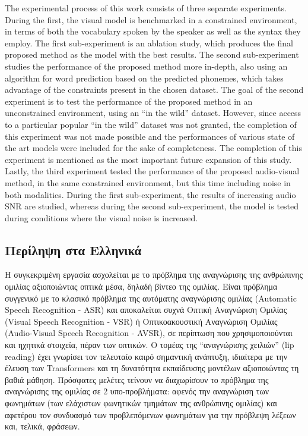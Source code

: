 The experimental process of this work consists of three separate experiments. During the first, the visual model is benchmarked in a constrained environment, in terms of both the vocabulary spoken by the speaker as well as the syntax they employ. The first sub-experiment is an ablation study, which produces the final proposed method as the model with the best results. The second sub-experiment studies the performance of the proposed method more in-depth, also using an algorithm for word prediction based on the predicted phonemes, which takes advantage of the constraints present in the chosen dataset. The goal of the second experiment is to test the performance of the proposed method in an unconstrained environment, using an ``in the wild'' dataset. However, since access to a particular popular ``in the wild'' dataset was not granted, the completion of this experiment was not made possible and the performances of various state of the art models were included for the sake of completeness. The completion of this experiment is mentioned as the most important future expansion of this study. Lastly, the third experiment tested the performance of the proposed audio-visual method, in the same constrained environment, but this time including noise in both modalities. During the first sub-experiment, the results of increasing audio SNR are studied, whereas during the second sub-experiment, the model is tested during conditions where the visual noise is increased.

\newpage
\subsection{Περίληψη στα Ελληνικά}

Η συγκεκριμένη εργασία ασχολείται με το πρόβλημα της αναγνώρισης της ανθρώπινης ομιλίας αξιοποιώντας οπτικά μέσα, δηλαδή βίντεο της ομιλίας. Είναι πρόβλημα συγγενικό με το κλασικό πρόβλημα της αυτόματης αναγνώρισης ομιλίας (Automatic Speech Recognition - ASR) και αποκαλείται συχνά Οπτική Αναγνώριση Ομιλίας (Visual Speech Recognition - VSR) ή Οπτικοακουστική Αναγνώριση Ομιλίας (Audio-Visual Speech Recognition - AVSR), σε περίπτωση που χρησιμοποιούνται και ηχητικά στοιχεία, πέραν των οπτικών. Ο τομέας της ``αναγνώρισης χειλιών'' (lip reading) έχει γνωρίσει τον τελευταίο καιρό σημαντική ανάπτυξη, ιδιαίτερα με την έλευση των Transformers και τη δυνατότητα εκπαίδευσης μοντέλων αξιοποιώντας τη βαθιά μάθηση. Πρόσφατες μελέτες τείνουν να διαχωρίσουν το πρόβλημα της αναγνώρισης της ομιλίας σε 2 υπο-προβλήματα: αφενός την αναγνώριση των φωνημάτων (των ελάχιστων φωνητικών τμημάτων της ανθρώπινης ομιλίας) και αφετέρου τον συνδυασμό των προβλεπόμενων φωνημάτων για την πρόβλεψη λέξεων και, τελικά, φράσεων.

